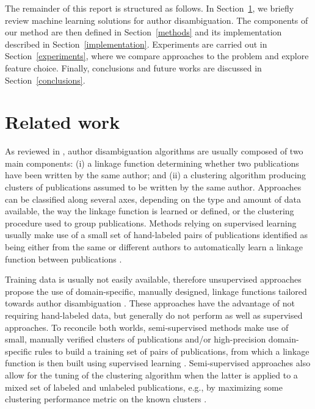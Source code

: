 \documentclass[runningheads,a4paper]{llncs}
\makeatletter
\newcommand*{\eg}{e.g.\@\xspace}
\makeatother
\begin{document}
The remainder of this report is structured as follows. In Section~\ref{related-works},
we briefly review machine learning solutions for author disambiguation. The components of our method are then defined in Section~\ref{methods} and its implementation described in Section~\ref{implementation}. Experiments
are carried out in Section~\ref{experiments}, where we compare
approaches to the problem and explore feature choice.
Finally, conclusions and future works are discussed in Section~\ref{conclusions}.


\section{Related work}
\label{related-works}


As reviewed in \cite{smalheiser2009author,ferreira2012brief,levin2012citation}, author
disambiguation algorithms are usually composed of two main components: (i) a
linkage function determining whether two publications have been written by the
same author; and (ii) a clustering algorithm producing clusters of publications
assumed to be written by the same author.
Approaches can be classified along several axes, depending on the type and
amount of data available, the way the linkage function is learned or defined, or the
clustering procedure used to group publications.
Methods relying on supervised learning usually make use of a small set of hand-labeled pairs
of publications identified as being either from the same or different authors to automatically learn a linkage
function between publications \cite{han2004two,huang2006efficient, culotta2007author,treeratpituk2009disambiguating,tran2014author}.

Training data is usually not easily available, therefore unsupervised approaches propose
the use of domain-specific, manually designed, linkage functions tailored towards author
disambiguation \cite{malin2005unsupervised,song2007efficient, kang2009co,schulz2014exploiting}.
These approaches have the advantage of not requiring hand-labeled data, but generally do
not perform as well as supervised approaches.
To reconcile both worlds, semi-supervised methods make use of small, manually verified clusters of
publications and/or high-precision domain-specific rules to build a training
set of pairs of publications, from which a linkage function is then built using supervised learning
\cite{ferreira2010effective,torvik2009author,levin2012citation}. Semi-supervised approaches also allow for the tuning of the
clustering algorithm when the latter is applied to a mixed set of labeled
and unlabeled publications, \eg, by maximizing some clustering performance
metric on the known clusters \cite{levin2012citation}.
\end{document}
